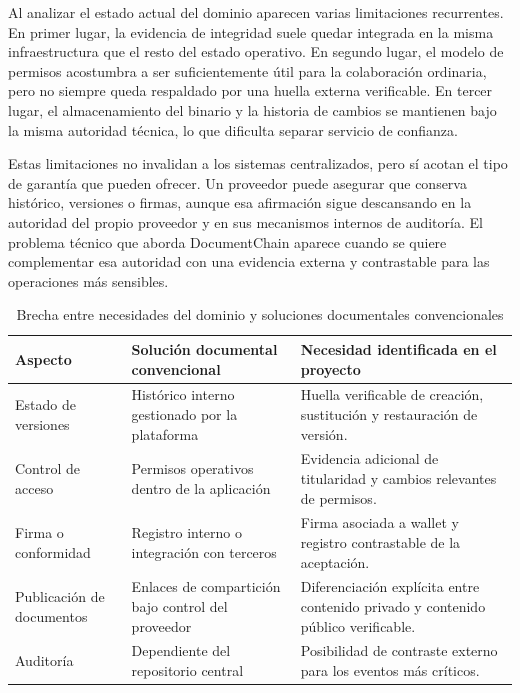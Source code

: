 \documentclass[11pt, a4paper]{article}
\begin{document}
Al analizar el estado actual del dominio aparecen varias limitaciones recurrentes. En primer lugar, la evidencia de integridad suele quedar integrada en la misma infraestructura que el resto del estado operativo. En segundo lugar, el modelo de permisos acostumbra a ser suficientemente útil para la colaboración ordinaria, pero no siempre queda respaldado por una huella externa verificable. En tercer lugar, el almacenamiento del binario y la historia de cambios se mantienen bajo la misma autoridad técnica, lo que dificulta separar servicio de confianza.

Estas limitaciones no invalidan a los sistemas centralizados, pero sí acotan el tipo de garantía que pueden ofrecer. Un proveedor puede asegurar que conserva histórico, versiones o firmas, aunque esa afirmación sigue descansando en la autoridad del propio proveedor y en sus mecanismos internos de auditoría. El problema técnico que aborda DocumentChain aparece cuando se quiere complementar esa autoridad con una evidencia externa y contrastable para las operaciones más sensibles.

\begin{table}[H]
    \centering
    \small
    \begin{tabular}{|p{4.4cm}|p{4cm}|p{4.5cm}|}
    \hline
    \textbf{Aspecto} & \textbf{Solución documental convencional} & \textbf{Necesidad identificada en el proyecto} \\
    \hline
    Estado de versiones & Histórico interno gestionado por la plataforma & Huella verificable de creación, sustitución y restauración de versión. \\
    \hline
    Control de acceso & Permisos operativos dentro de la aplicación & Evidencia adicional de titularidad y cambios relevantes de permisos. \\
    \hline
    Firma o conformidad & Registro interno o integración con terceros & Firma asociada a wallet y registro contrastable de la aceptación. \\
    \hline
    Publicación de documentos & Enlaces de compartición bajo control del proveedor & Diferenciación explícita entre contenido privado y contenido público verificable. \\
    \hline
    Auditoría & Dependiente del repositorio central & Posibilidad de contraste externo para los eventos más críticos. \\
    \hline
    \end{tabular}
    \caption{Brecha entre necesidades del dominio y soluciones documentales convencionales}
    \label{tab:brecha-soluciones}
\end{table}
\end{document}
